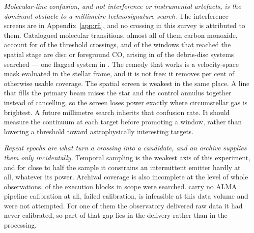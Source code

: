 \emph{Molecular-line confusion, and not interference or instrumental
artefacts, is the dominant obstacle to a millimetre technosignature
search.} The interference screens are in Appendix~\ref{app:rfi}, and no
crossing in this survey is attributed to them. Catalogued molecular
transitions, almost all of them carbon monoxide,
account for \NAttributed{} of the \NCross{} threshold crossings, and \DiscFpWin{} of the \DiscFpOfFlags{} windows that
reached the spatial stage are disc or foreground CO, arising in
\DiscFpSys{} of the \NDebrisKwSys{} debris-disc systems searched --- one
flagged system in \DiscFpOneIn. The remedy that works is a velocity-space
mask evaluated in the stellar frame, and it is not free: it removes
\MaskLostPct{} per cent of otherwise usable coverage. The spatial screen is weakest in the same place. A line that fills the
primary beam raises the star and the control annulus together instead of
cancelling, so the screen loses power exactly where circumstellar gas is
brightest. A future millimetre search inherits that confusion rate. It
should measure the continuum at each target before promoting a window,
rather than lowering a threshold toward astrophysically interesting
targets.

\emph{Repeat epochs are what turn a crossing into a candidate, and an
archive supplies them only incidentally.} Temporal sampling is the weakest
axis of this experiment, and for close to half the sample it constrains an
intermittent emitter hardly at all, whatever its power. Archival coverage is also incomplete at the level of whole observations.
\FateDone{} of the \FateScope{} execution blocks in scope were searched.
\FateNoCal{} carry no ALMA pipeline calibration at all, \FateCalFail{}
failed calibration, \FateInfeas{} is infeasible at this data volume and
\FateUnattempted{} were not attempted. For one of them the observatory
delivered raw data it had never calibrated, so part of that gap lies in the
delivery rather than in the processing.

